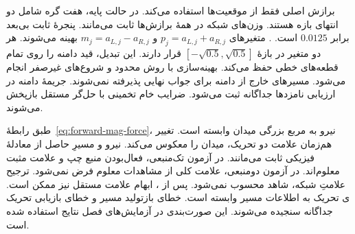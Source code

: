 برازش اصلی فقط از موقعیت‌ها استفاده می‌کند.
در حالت پایه، هفت گره شامل دو انتهای بازه هستند.
وزن‌های شبکه در همهٔ برازش‌ها ثابت می‌مانند.
پنجرهٔ ثابت بی‌بعد برابر $0.0125$ است.
.
متغیرهای $p_j=a_{L,j}+a_{R,j}$ و $m_j=a_{L,j}-a_{R,j}$ بهینه می‌شوند.
هر دو متغیر در بازهٔ $[-\sqrt{0.5},\sqrt{0.5}]$ قرار دارند.
این تبدیل، قید دامنه را روی تمام قطعه‌های خطی حفظ می‌کند.
بهینه‌سازی با روش محدود  و شروع‌های غیرصفر انجام می‌شود.
مسیرهای خارج از دامنه برای جواب نهایی پذیرفته نمی‌شوند.
جریمهٔ دامنه در ارزیابی نامزدها جداگانه ثبت می‌شود.
ضرایب خام تخمینی با حل‌گر مستقل بازپخش می‌شوند.

طبق رابطهٔ~\eqref{eq:forward-mag-force}، نیرو به مربع بزرگی میدان وابسته است.
تغییر هم‌زمان علامت دو تحریک، میدان را معکوس می‌کند.
نیرو و مسیرِ حاصل از معادلهٔ فیزیکی ثابت می‌مانند.
در آزمون تک‌منبعی، فعال‌بودن منبع چپ و علامت مثبت معلوم‌اند.
در آزمون دومنبعی، علامت کلی از مشاهدات معلوم فرض نمی‌شود.
ترجیح علامتِ شبکه، شاهد  محسوب نمی‌شود.
پس از ، ابهام علامت مستقل نیز ممکن است.
ی تحریک به اطلاعات مسیر وابسته است.
خطای بازتولید مسیر و خطای بازیابی تحریک جداگانه سنجیده می‌شوند.
این صورت‌بندی در آزمایش‌های فصل نتایج استفاده شده است.

